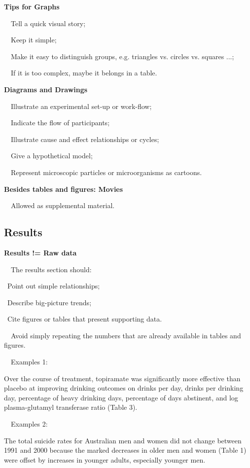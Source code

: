 \documentclass[a4paper, 12pt]{article}
\begin{document}
\textbf{Tips for Graphs}
\par\ \textbullet\ Tell a quick visual story;
\par\ \textbullet\ Keep it simple;
\par\ \textbullet\ Make it easy to distinguish groups, e.g. triangles vs. circles vs. squares ...;
\par\ \textbullet\ If it is too complex, maybe it belongs in a table.

\newpage\textbf{Diagrams and Drawings}
\par\ \textbullet\ Illustrate an experimental set-up or work-flow;
\par\ \textbullet\ Indicate the flow of participants;
\par\ \textbullet\ Illustrate cause and effect relationships or cycles;
\par\ \textbullet\ Give a hypothetical model;
\par\ \textbullet\ Represent microscopic particles or microorganisms as cartoons.

\textbf{Besides tables and figures: Movies}
\par\ \textbullet\ Allowed as supplemental material.

\newpage\subsection{Results}

\textbf{Results != Raw data}
\par\ \textbullet\ The results section should:
\par\quad\textopenbullet\ Point out simple relationships;
\par\quad\textopenbullet\ Describe big-picture trends;
\par\quad\textopenbullet\ Cite figures or tables that present supporting data.
\par\ \textbullet\ Avoid simply repeating the numbers that are already available in tables and figures.

\par\ \textbullet\ Examples 1:
\par Over the course of treatment, topiramate was significantly more effective than placebo at improving drinking outcomes on drinks per day,
drinks per drinking day, percentage of heavy drinking days, percentage of days abstinent, and log plasma-glutamyl transferase ratio (Table 3).

\par\ \textbullet\ Examples 2:
\par The total suicide rates for Australian men and women did not change between 1991 and 2000 because the marked decreases in older men and women (Table 1)
were offset by increases in younger adults,
especially younger men.
\end{document}

